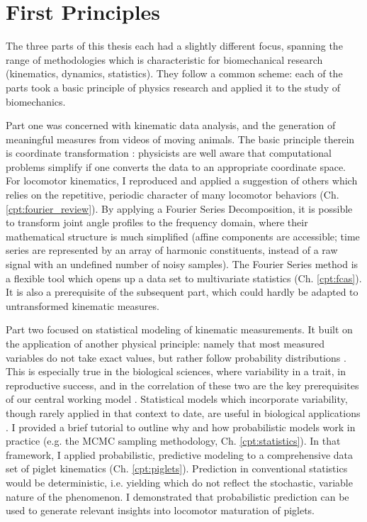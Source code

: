 \section{First Principles}
\label{sec:orgf9ff869}
The three parts of this thesis each had a slightly different focus, spanning the range of methodologies which is characteristic for biomechanical research (kinematics, dynamics, statistics).
They follow a common scheme:
each of the parts took a basic principle of physics research and applied it to the study of biomechanics.


Part one was concerned with kinematic data analysis, and the generation of meaningful measures from videos of moving animals.
The basic principle therein is coordinate transformation \citep{Tipler2007}: physicists are well aware that computational problems simplify if one converts the data to an appropriate coordinate space.
For locomotor kinematics, I reproduced and applied a suggestion of others \citep{Bernstein1927a,Webb2007} which relies on the repetitive, periodic character of many locomotor behaviors (Ch. \ref{cpt:fourier_review}).
By applying a Fourier Series Decomposition, it is possible to transform joint angle profiles to the frequency domain, where their mathematical structure is much simplified (affine components are accessible; time series are represented by an array of harmonic constituents, instead of a raw signal with an undefined number of noisy samples).
The Fourier Series method is a flexible tool which opens up a data set to multivariate statistics (Ch. \ref{cpt:fcas}).
It is also a prerequisite of the subsequent part, which could hardly be adapted to untransformed kinematic measures.

\medskip
Part two focused on statistical modeling of kinematic measurements.
It built on the application of another physical principle: namely that most measured variables do not take exact values, but rather follow probability distributions \citep{2022Probability}.
This is especially true in the biological sciences, where variability in a trait, in reproductive success, and in the correlation of these two are the key prerequisites of our central working model \citep{Darwin1859}.
Statistical models which incorporate variability, though rarely applied in that context to date, are useful in biological applications \citep{Roraas2019,DeGroote2021}.
I provided a brief tutorial to outline why and how probabilistic models work in practice (e.g. the MCMC sampling methodology, Ch. \ref{cpt:statistics}).
In that framework, I applied probabilistic, predictive modeling to a comprehensive data set of piglet kinematics (Ch. \ref{cpt:piglets}).
Prediction in conventional statistics would be deterministic, i.e. yielding  which do not reflect the stochastic, variable nature of the phenomenon.
I demonstrated that probabilistic prediction can be used to generate relevant insights into locomotor maturation of piglets.

